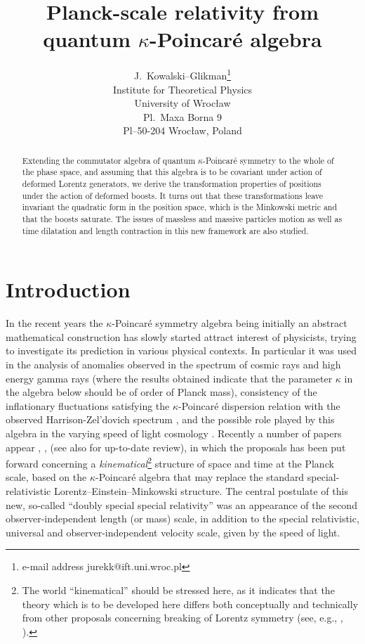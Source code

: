 \documentclass[a4paper,a4paper]{article}
\begin{document}
\title{%
Planck-scale relativity from quantum $\kappa$-Poincar\'e algebra}
\author{ J.\ Kowalski--Glikman\thanks{e-mail
address jurekk@ift.uni.wroc.pl}\\ Institute for Theoretical
Physics\\ University of Wroc\l{}aw\\ Pl.\ Maxa Borna 9\\
Pl--50-204 Wroc\l{}aw, Poland} \maketitle

\begin{abstract}
Extending the commutator algebra of quantum $\kappa$-Poincar\'e symmetry to the whole of the phase space, and assuming that this algebra is to be covariant under action of deformed Lorentz generators, we derive the transformation properties of positions under the action of deformed boosts. It turns out that these transformations leave invariant the quadratic form in the position space, which is the Minkowski metric and that the boosts saturate. The issues of massless and massive particles motion as well as time dilatation and length contraction in this new framework are also studied.
\end{abstract}
\clearpage

\section{Introduction}

In the recent years the $\kappa$-Poincar\'e symmetry algebra \cite{lunoruto, maru, luruto, luruza, luno} being initially an abstract mathematical construction has slowly started attract interest of physicists, trying to investigate its prediction in various physical contexts. In particular it was used in the analysis of anomalies observed in the spectrum of cosmic rays and  high energy gamma rays \cite{gacpir} (where the results obtained indicate that the parameter $\kappa$ in the algebra below should be of order of Planck mass), consistency of the inflationary fluctuations satisfying the $\kappa$-Poincar\'e dispersion relation with the observed Harrison-Zel'dovich spectrum \cite{jkgcosm}, and the possible role played by this algebra in the varying speed of light cosmology \cite{stjo}. Recently   a number of papers appear \cite{gac1}, \cite{gac2}, \cite{jkgminl} (see also \cite{gacnew} for up-to-date review), in which the proposals has been put forward concerning a {\em kinematical}\footnote{The world ``kinematical'' should be stressed here, as it indicates that the theory which is to be developed here differs both conceptually and technically from other proposals concerning breaking of Lorentz symmetry (see, e.g., \cite{kost}, \cite{jac}).} structure of space  and time at the Planck scale, based on the $\kappa$-Poincar\'e  algebra that may replace the standard special-relativistic Lorentz--Einstein--Minkowski structure. The central postulate of this new, so-called        ``doubly special special relativity'' was  an appearance of the second  observer-independent length (or mass) scale, in addition to the special relativistic, universal and observer-independent velocity scale, given by the speed of light.
\end{document}
